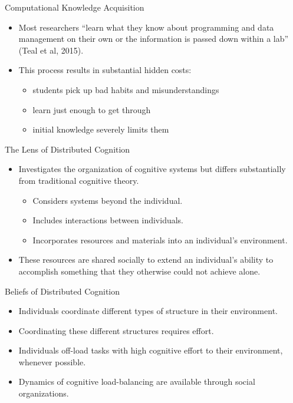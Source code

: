 \documentclass[10pt,ignorenonframetext,]{beamer}
\providecommand{\tightlist}{%
  \setlength{\itemsep}{0pt}\setlength{\parskip}{0pt}}
\begin{document}
\begin{frame}{Computational Knowledge Acquisition}

\begin{itemize}[<+->]
\item
  Most researchers ``learn what they know about programming and data
  management on their own or the information is passed down within a
  lab'' (Teal et al, 2015).
\item
  This process results in substantial hidden costs:

  \begin{itemize}[<+->]
  \tightlist
  \item
    students pick up bad habits and misunderstandings\\
  \item
    learn just enough to get through\\
  \item
    initial knowledge severely limits them
  \end{itemize}
\end{itemize}

\end{frame}

\begin{frame}{The Lens of Distributed Cognition}

\begin{itemize}[<+->]
\tightlist
\item
  Investigates the organization of cognitive systems but differs
  substantially from traditional cognitive theory.

  \begin{itemize}[<+->]
  \tightlist
  \item
    Considers systems beyond the individual.
  \item
    Includes interactions between individuals.
  \item
    Incorporates resources and materials into an individual's
    environment.
  \end{itemize}
\item
  These resources are shared socially to extend an individual's ability
  to accomplish something that they otherwise could not achieve alone.
\end{itemize}

\end{frame}

\begin{frame}{Beliefs of Distributed Cognition}

\begin{itemize}[<+->]
\item
  Individuals coordinate different types of structure in their
  environment.
\item
  Coordinating these different structures requires effort.
\item
  Individuals off-load tasks with high cognitive effort to their
  environment, whenever possible.
\item
  Dynamics of cognitive load-balancing are available through social
  organizations.
\end{itemize}

\end{frame}
\end{document}
